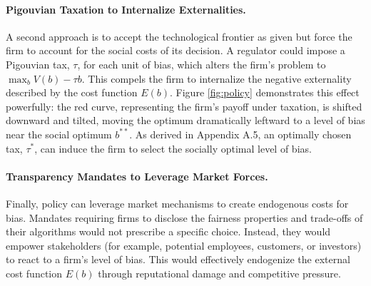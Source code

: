 \documentclass[12pt,a4paper]{article}
\theoremstyle{definition}
\theoremstyle{remark}
\begin{document}
\paragraph{Pigouvian Taxation to Internalize Externalities.}
A second approach is to accept the technological frontier as given but force the firm to account for the social costs of its decision. A regulator could impose a Pigouvian tax, $\tau$, for each unit of bias, which alters the firm's problem to $\max_b V(b) - \tau b$. This compels the firm to internalize the negative externality described by the cost function $E(b)$. Figure \ref{fig:policy} demonstrates this effect powerfully: the red curve, representing the firm's payoff under taxation, is shifted downward and tilted, moving the optimum dramatically leftward to a level of bias near the social optimum $b^{**}$. As derived in Appendix A.5, an optimally chosen tax, $\tau^*$, can induce the firm to select the socially optimal level of bias.

\paragraph{Transparency Mandates to Leverage Market Forces.}
Finally, policy can leverage market mechanisms to create endogenous costs for bias. Mandates requiring firms to disclose the fairness properties and trade-offs of their algorithms would not prescribe a specific choice. Instead, they would empower stakeholders (for example, potential employees, customers, or investors) to react to a firm's level of bias. This would effectively endogenize the external cost function $E(b)$ through reputational damage and competitive pressure.
\end{document}
